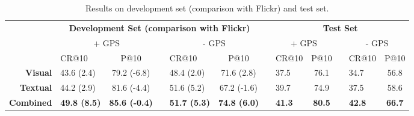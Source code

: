 \documentclass{acm_proc_article-me11_tweaked}
\begin{document}
\begin{table*}
\centering
\caption{Results on development set (comparison with Flickr) and test set.}
 \begin{tabular}{|r|l|ccl|ccl|ccl|c|}
\cline{2-12}
   \multicolumn{1}{c|}{ } & \multicolumn{5}{c}{\bfseries Development Set (comparison with Flickr)}  & \vrule height2.75ex depth1.25ex width 1pt &  \multicolumn{5}{c|}{\bfseries Test Set} \\\cline{2-12}    
   \multicolumn{1}{c|}{ } & \multicolumn{2}{c}{ + GPS}  & \vrule height2.75ex depth1.25ex width 1pt & \multicolumn{2}{c}{ - GPS} & \vrule height2.75ex depth1.25ex width 1pt & \multicolumn{2}{c}{ + GPS}  & \vrule height2.75ex depth1.25ex width 1pt & \multicolumn{2}{c|}{ - GPS} \\\cline{2-12}
   \multicolumn{1}{c|}{ } &  CR@10 &   P@10 & \vrule height2.75ex depth1.25ex width 1pt &  CR@10 &  P@10 & \vrule height2.75ex depth1.25ex width 1pt &  CR@10 &   P@10 & \vrule height2.75ex depth1.25ex width 1pt &   CR@10 &  P@10 \\
   \hline
   \bfseries Visual   & 43.6  (2.4) & 79.2 (-6.8) & \vrule height2.75ex depth1.25ex width 1pt & 48.4 (2.0)&  71.6 (2.8)& \vrule height2.75ex depth1.25ex width 1pt & 37.5 & 76.1 & \vrule height2.75ex depth1.25ex width 1pt & 34.7 & 56.8\\\hline
  \bfseries Textual  &  44.2  (2.9)  & 81.6 (-4.4) & \vrule height2.75ex depth1.25ex width 1pt & 51.6 (5.2) & 67.2 (-1.6)& \vrule height2.75ex depth1.25ex width 1pt &  39.7  & 74.9 & \vrule height2.75ex depth1.25ex width 1pt & 37.5 & 58.6\\\hline
  \bfseries Combined & \bfseries 49.8  (8.5) & \bfseries 85.6 (-0.4) & \vrule height2.75ex depth1.25ex width 1pt & \bfseries  51.7 (5.3)  & \bfseries 74.8  (6.0)& \vrule height2.75ex depth1.25ex width 1pt  & \bfseries 41.3 & \bfseries 80.5 & \vrule height2.75ex depth1.25ex width 1pt & \bfseries  42.8  & \bfseries 66.7 \\
    \hline
  \end{tabular}
  \label{tbl:devset}

  
  
\end{table*} 
\end{document}
